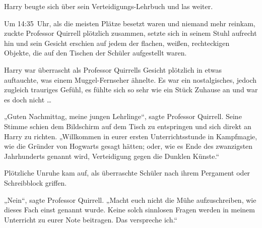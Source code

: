 Harry beugte sich über sein Verteidigungs-Lehrbuch und las weiter.

\later

Um 14:35~Uhr, als die meisten Plätze besetzt waren und niemand mehr reinkam, zuckte Professor Quirrell plötzlich zusammen, setzte sich in seinem Stuhl aufrecht hin und sein Gesicht erschien auf jedem der flachen, weißen, rechteckigen Objekte, die auf den Tischen der Schüler aufgestellt waren.

Harry war überrascht als Professor Quirrells Gesicht plötzlich in etwas auftauchte, was einem Muggel-Fernseher ähnelte. Es war ein nostalgisches, jedoch zugleich trauriges Gefühl, es fühlte sich so sehr wie ein Stück Zuhause an und war es doch nicht …

„Guten Nachmittag, meine jungen Lehrlinge“, sagte Professor Quirrell. Seine Stimme schien dem Bildschirm auf dem Tisch zu entspringen und sich direkt an Harry zu richten. „Willkommen in eurer ersten Unterrichtsstunde in Kampfmagie, wie die Gründer von Hogwarts gesagt hätten; oder, wie es Ende des zwanzigsten Jahrhunderts genannt wird, Verteidigung gegen die Dunklen Künste.“

Plötzliche Unruhe kam auf, als überraschte Schüler nach ihrem Pergament oder Schreibblock griffen.

„Nein“, sagte Professor Quirrell. „Macht euch nicht die Mühe aufzuschreiben, wie dieses Fach einst genannt wurde. Keine solch sinnlosen Fragen werden in meinem Unterricht zu eurer Note beitragen. Das verspreche ich.“

